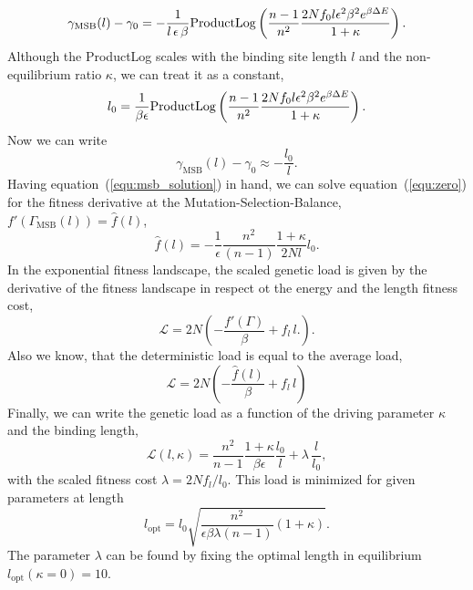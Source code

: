 \begin{equation}
\gamma_\mathrm{MSB}(l) - \gamma_0= -\frac{1}{l\,\epsilon\,\beta} \mathrm{ProductLog}\left( \frac{n-1}{n^2}\frac{ 2N f_0 l \epsilon^2 \beta^2e^{\beta\Delta E}}{1+\kappa}\right).
\end{equation}
Although the ProductLog scales with the binding site length $l$ and the non-equilibrium ratio $\kappa$, we can treat it as a constant,
\begin{equation}
	l_0 = \frac{1}{\beta\epsilon}\mathrm{ProductLog}\left( \frac{n-1}{n^2}\frac{ 2N f_0 l \epsilon^2 \beta^2e^{\beta\Delta E}}{1+\kappa}\right).\label{equ:l0_def}
\end{equation}
Now we can write
\begin{equation}
\gamma_\mathrm{MSB}(l) - \gamma_0\approx -\frac{l_0}{l}. \label{equ:intensive_scaling}
\end{equation}
Having equation~(\ref{equ:msb_solution}) in hand, we can solve equation~(\ref{equ:zero}) for the fitness derivative at the Mutation-Selection-Balance,
 $f'\left(\Gamma_\mathrm{MSB}(l)\right)=\hat{f}(l)$,
 \begin{equation}
	\hat{f}(l) = -\frac{1}{\epsilon}\frac{n^2}{(n-1)}\frac{1+\kappa}{2N l}l_0. \label{equ:fitness_deriv}
\end{equation}
 In the exponential fitness landscape, the scaled genetic load is given by the derivative of the fitness landscape in respect ot the energy and the length fitness cost,
\begin{equation}
	\mathcal{L}= 2N\left(-\frac{f'(\Gamma)}{\beta}+f_l\,l.\right).
\end{equation}
Also we know, that the deterministic load is equal to the average load,
\begin{equation}
	\mathcal{L}= 2N\left(-\frac{\hat{f}(l)}{\beta}+f_l\,l\right)
\end{equation}
Finally, we can write the genetic load as a function of the driving parameter $\kappa$ and the binding length,
\begin{equation}
	\mathcal{L}(l,\kappa)=\frac{n^2}{n-1}\frac{1+\kappa}{\beta\epsilon}\frac{l_0}{l}+\lambda\,\frac{l}{l_0},
\end{equation} 
with the scaled fitness cost $\lambda=2Nf_l/l_0$. This load is minimized for given parameters at length
\begin{equation}
	l_\mathrm{opt} = l_0\sqrt{\frac{n^2}{\epsilon\beta \lambda (n-1)}(1+\kappa)}.
\end{equation}
The parameter $\lambda$ can be found by fixing the optimal length in equilibrium $l_\mathrm{opt}(\kappa=0)=10$.
